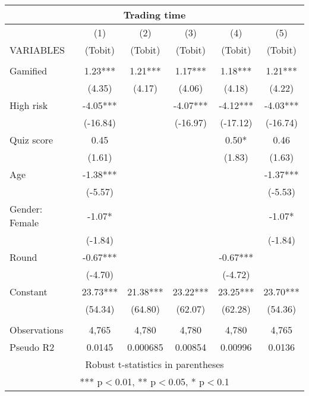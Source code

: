 \documentclass[]{article}
\begin{document}
\begin{tabular}{lccccc}
\multicolumn{6}{c}{Trading time} \\ \hline
 & (1) & (2) & (3) & (4) & (5) \\
VARIABLES & (Tobit) & (Tobit) & (Tobit) & (Tobit) & (Tobit) \\ \hline
 &  &  &  &  &  \\
Gamified & 1.23*** & 1.21*** & 1.17*** & 1.18*** & 1.21*** \\
 & (4.35) & (4.17) & (4.06) & (4.18) & (4.22) \\
High risk & -4.05*** &  & -4.07*** & -4.12*** & -4.03*** \\
 & (-16.84) &  & (-16.97) & (-17.12) & (-16.74) \\
Quiz score & 0.45 &  &  & 0.50* & 0.46 \\
 & (1.61) &  &  & (1.83) & (1.63) \\
Age & -1.38*** &  &  &  & -1.37*** \\
 & (-5.57) &  &  &  & (-5.53) \\
Gender: Female & -1.07* &  &  &  & -1.07* \\
 & (-1.84) &  &  &  & (-1.84) \\
Round & -0.67*** &  &  & -0.67*** &  \\
 & (-4.70) &  &  & (-4.72) &  \\
Constant & 23.73*** & 21.38*** & 23.22*** & 23.25*** & 23.70*** \\
 & (54.34) & (64.80) & (62.07) & (62.28) & (54.36) \\
 &  &  &  &  &  \\
Observations & 4,765 & 4,780 & 4,780 & 4,780 & 4,765 \\
 Pseudo R2 & 0.0145 & 0.000685 & 0.00854 & 0.00996 & 0.0136 \\ \hline
\multicolumn{6}{c}{ Robust t-statistics in parentheses} \\
\multicolumn{6}{c}{ *** p$<$0.01, ** p$<$0.05, * p$<$0.1} \\
\end{tabular}
\end{document}
